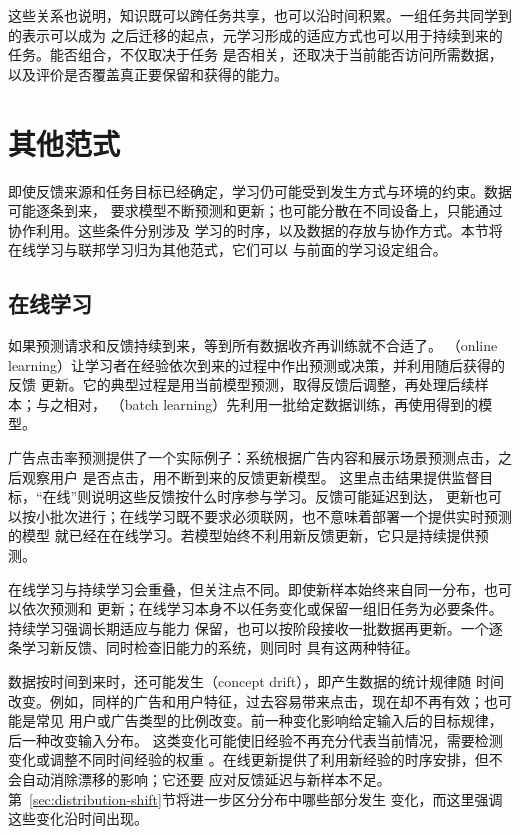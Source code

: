 这些关系也说明，知识既可以跨任务共享，也可以沿时间积累。一组任务共同学到的表示可以成为
之后迁移的起点，元学习形成的适应方式也可以用于持续到来的任务。能否组合，不仅取决于任务
是否相关，还取决于当前能否访问所需数据，以及评价是否覆盖真正要保留和获得的能力。

\section{其他范式}
\label{sec:other-learning-settings}

即使反馈来源和任务目标已经确定，学习仍可能受到发生方式与环境的约束。数据可能逐条到来，
要求模型不断预测和更新；也可能分散在不同设备上，只能通过协作利用。这些条件分别涉及
学习的时序，以及数据的存放与协作方式。本节将在线学习与联邦学习归为其他范式，它们可以
与前面的学习设定组合。

\subsection{在线学习}
\label{sec:online-learning}

如果预测请求和反馈持续到来，等到所有数据收齐再训练就不合适了。
（online learning）让学习者在经验依次到来的过程中作出预测或决策，并利用随后获得的反馈
更新。它的典型过程是用当前模型预测，取得反馈后调整，再处理后续样本；与之相对，
（batch learning）先利用一批给定数据训练，再使用得到的模型。

广告点击率预测提供了一个实际例子：系统根据广告内容和展示场景预测点击，之后观察用户
是否点击，用不断到来的反馈更新模型。
这里点击结果提供监督目标，“在线”则说明这些反馈按什么时序参与学习。反馈可能延迟到达，
更新也可以按小批次进行；在线学习既不要求必须联网，也不意味着部署一个提供实时预测的模型
就已经在在线学习。若模型始终不利用新反馈更新，它只是持续提供预测。

在线学习与持续学习会重叠，但关注点不同。即使新样本始终来自同一分布，也可以依次预测和
更新；在线学习本身不以任务变化或保留一组旧任务为必要条件。持续学习强调长期适应与能力
保留，也可以按阶段接收一批数据再更新。一个逐条学习新反馈、同时检查旧能力的系统，则同时
具有这两种特征。

数据按时间到来时，还可能发生（concept drift），即产生数据的统计规律随
时间改变。例如，同样的广告和用户特征，过去容易带来点击，现在却不再有效；也可能是常见
用户或广告类型的比例改变。前一种变化影响给定输入后的目标规律，后一种改变输入分布。
这类变化可能使旧经验不再充分代表当前情况，需要检测变化或调整不同时间经验的权重
。在线更新提供了利用新经验的时序安排，但不会自动消除漂移的影响；它还要
应对反馈延迟与新样本不足。第~\ref{sec:distribution-shift}节将进一步区分分布中哪些部分发生
变化，而这里强调这些变化沿时间出现。


